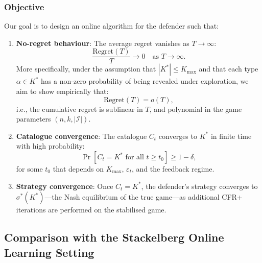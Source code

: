 \documentclass[sigconf]{aamas}
\newcommand{\Kmax}{K_{\max}}
\begin{document}
\subsubsection{Objective}
Our goal is to design an online algorithm for the defender such that:
\begin{enumerate}
    \item \textbf{No-regret behaviour}: The average regret vanishes as $T \to \infty$:
    \begin{equation}
        \frac{\mathrm{Regret}(T)}{T} \to 0 \quad \text{as } T \to \infty.
        \label{eq:no_regret}
    \end{equation}
    More specifically, under the assumption that $|K^*| \leq \Kmax$ and that each type $\alpha \in K^*$ has a non-zero probability of being revealed under exploration, we aim to show empirically that:
    \begin{equation}
        \mathrm{Regret}(T) = o(T),
        \label{eq:sublinear}
    \end{equation}
    i.e., the cumulative regret is sublinear in $T$, and polynomial in the game parameters $(n, k, |\mathcal{I}|)$.

    \item \textbf{Catalogue convergence}: The catalogue $C_t$ converges to $K^*$ in finite time with high probability:
    \begin{equation}
        \Pr\!\left[C_t = K^* \text{ for all } t \geq t_0\right] \geq 1 - \delta,
        \label{eq:catalogue_convergence}
    \end{equation}
    for some $t_0$ that depends on $\Kmax$, $\varepsilon_t$, and the feedback regime.

    \item \textbf{Strategy convergence}: Once $C_t = K^*$, the defender's strategy converges to $\sigma^*(K^*)$---the Nash equilibrium of the true game---as additional CFR+ iterations are performed on the stabilised game.
\end{enumerate}

\subsection{Comparison with the Stackelberg Online Learning Setting}
\label{sec:comparison}
\end{document}
